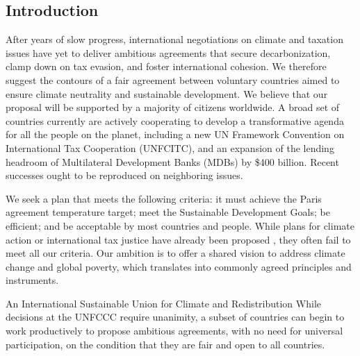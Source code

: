 \documentclass[12pt,english]{article}
\begin{document}
\onehalfspacing
\renewcommand\bibname{References} 
\begin{bibunit}


\section{Introduction}
After years of slow progress, international negotiations on climate and taxation issues have yet to deliver ambitious agreements that secure decarbonization, clamp down on tax evasion, and foster international cohesion. We therefore suggest the contours of a fair agreement between voluntary countries aimed to ensure climate neutrality and sustainable development. We believe that our proposal will be supported by a majority of citizens worldwide.
A broad set of countries currently are actively cooperating to develop a transformative agenda for all the people on the planet, including a new UN Framework Convention on International Tax Cooperation (UNFCITC), and an expansion of the lending headroom of Multilateral Development Banks (MDBs) by \$400 billion. Recent successes ought to be reproduced on neighboring issues.

We seek a plan that meets the following criteria: it must achieve the Paris agreement temperature target; meet the Sustainable Development Goals; be efficient; and be acceptable by most countries and people. While plans for climate action or international tax justice have already been proposed \citep{pisani-ferry_global_2025,zucman_blueprint_2024,bolton_why_2025}, they often fail to meet all our criteria. Our ambition is to offer a shared vision to address climate change and global poverty, which translates into commonly agreed principles and instruments.

An International Sustainable Union for Climate and Redistribution
While decisions at the UNFCCC require unanimity, a subset of countries can begin to work productively to propose ambitious agreements, with no need for universal participation, on the condition that they are fair and open to all countries.


\end{bibunit}
\end{document}
